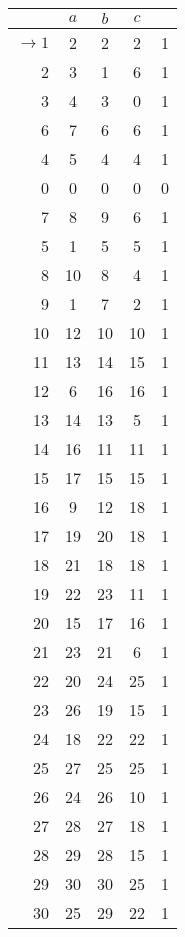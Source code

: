 \begin{solution}
\begin{enumerate}[(a)]
        \begin{center}\begin{tabular}{r|c c c r}
            & $a$ & $b$ & $c$ &\\\hline
               $\to1$ & 2 & 2 & 2 & 1\\
                2 & 3 & 1 & 6 & 1\\
                3 & 4 & 3 & 0 & 1\\
                6 & 7 & 6 & 6 & 1\\
                4 & 5 & 4 & 4 & 1\\
                0 & 0 & 0 & 0 & 0\\
                7 & 8 & 9 & 6 & 1\\
                5 & 1 & 5 & 5 & 1\\
                8 & 10 & 8 & 4 & 1\\
                9 & 1 & 7 & 2 & 1\\
                10 & 12 & 10 & 10 & 1\\
                11 & 13 & 14 & 15 & 1\\
                12 & 6 & 16 & 16 & 1\\
                13 & 14 & 13 & 5 & 1\\
                14 & 16 & 11 & 11 & 1\\
                15 & 17 & 15 & 15 & 1\\
                16 & 9 & 12 & 18 & 1\\
                17 & 19 & 20 & 18 & 1\\
                18 & 21 & 18 & 18 & 1\\
                19 & 22 & 23 & 11 & 1\\
                20 & 15 & 17 & 16 & 1\\
                21 & 23 & 21 & 6 & 1\\
                22 & 20 & 24 & 25 & 1\\
                23 & 26 & 19 & 15 & 1\\
                24 & 18 & 22 & 22 & 1\\
                25 & 27 & 25 & 25 & 1\\
                26 & 24 & 26 & 10 & 1\\
                27 & 28 & 27 & 18 & 1\\
                28 & 29 & 28 & 15 & 1\\
                29 & 30 & 30 & 25 & 1\\
                30 & 25 & 29 & 22 & 1
           \end{tabular}\end{center}


\end{enumerate}
\end{solution}
